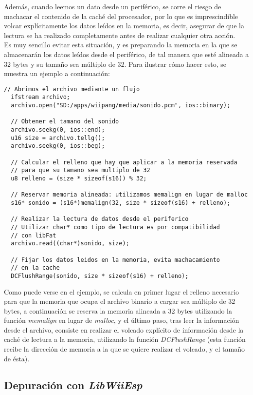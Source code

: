 Además, cuando leemos un dato desde un periférico, se corre el riesgo de machacar el contenido de la caché del procesador, por lo que es imprescindible volcar explícitamente los datos leídos en la memoria, es decir, asegurar de que la lectura se ha realizado completamente antes de realizar cualquier otra acción. \\

Es muy sencillo evitar esta situación, y es preparando la memoria en la que se almacenarán los datos leídos desde el periférico, de tal manera que esté alineada a 32 bytes y su tamaño sea múltiplo de 32. Para ilustrar cómo hacer esto, se muestra un ejemplo a continuación:

\begin{lstlisting}[style=C++]
  // Abrimos el archivo mediante un flujo
  ifstream archivo;
  archivo.open("SD:/apps/wiipang/media/sonido.pcm", ios::binary);

  // Obtener el tamano del sonido
  archivo.seekg(0, ios::end);
  u16 size = archivo.tellg();
  archivo.seekg(0, ios::beg);

  // Calcular el relleno que hay que aplicar a la memoria reservada
  // para que su tamano sea multiplo de 32
  u8 relleno = (size * sizeof(s16)) % 32;

  // Reservar memoria alineada: utilizamos memalign en lugar de malloc
  s16* sonido = (s16*)memalign(32, size * sizeof(s16) + relleno);

  // Realizar la lectura de datos desde el periferico
  // Utilizar char* como tipo de lectura es por compatibilidad
  // con libFat
  archivo.read((char*)sonido, size);

  // Fijar los datos leidos en la memoria, evita machacamiento
  // en la cache
  DCFlushRange(sonido, size * sizeof(s16) + relleno);
\end{lstlisting}

Como puede verse en el ejemplo, se calcula en primer lugar el relleno necesario para que la memoria que ocupa el archivo binario a cargar sea múltiplo de 32 bytes, a continuación se reserva la memoria alineada a 32 bytes utilizando la función \emph{memalign} en lugar de \emph{malloc}, y el último paso, tras leer la información desde el archivo, consiste en realizar el volcado explícito de información desde la caché de lectura a la memoria, utilizando la función \emph{DCFlushRange} (esta función recibe la dirección de memoria a la que se quiere realizar el volcado, y el tamaño de ésta).

\subsection{Depuración con \emph{LibWiiEsp}}

